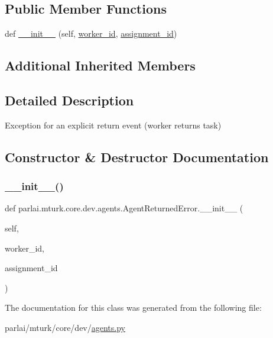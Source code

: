\subsection*{Public Member Functions}
\begin{DoxyCompactItemize}
\item 
def \hyperlink{classparlai_1_1mturk_1_1core_1_1dev_1_1agents_1_1AgentReturnedError_a95885f02dee5d24bdff9b82f90730061}{\+\_\+\+\_\+init\+\_\+\+\_\+} (self, \hyperlink{classparlai_1_1mturk_1_1core_1_1dev_1_1agents_1_1AbsentAgentError_a26db50c87a5d4954907d538de3da875c}{worker\+\_\+id}, \hyperlink{classparlai_1_1mturk_1_1core_1_1dev_1_1agents_1_1AbsentAgentError_ab9cf020196d28024b307c41a3fff6be1}{assignment\+\_\+id})
\end{DoxyCompactItemize}
\subsection*{Additional Inherited Members}


\subsection{Detailed Description}
\begin{DoxyVerb}Exception for an explicit return event (worker returns task)
\end{DoxyVerb}
 

\subsection{Constructor \& Destructor Documentation}
\mbox{\label{classparlai_1_1mturk_1_1core_1_1dev_1_1agents_1_1AgentReturnedError_a95885f02dee5d24bdff9b82f90730061}} 
\subsubsection{\texorpdfstring{\+\_\+\+\_\+init\+\_\+\+\_\+()}{\_\_init\_\_()}}
{\footnotesize\ttfamily def parlai.\+mturk.\+core.\+dev.\+agents.\+Agent\+Returned\+Error.\+\_\+\+\_\+init\+\_\+\+\_\+ (\begin{DoxyParamCaption}\item[{}]{self,  }\item[{}]{worker\+\_\+id,  }\item[{}]{assignment\+\_\+id }\end{DoxyParamCaption})}



The documentation for this class was generated from the following file\+:\begin{DoxyCompactItemize}
\item 
parlai/mturk/core/dev/\hyperlink{parlai_2mturk_2core_2dev_2agents_8py}{agents.\+py}\end{DoxyCompactItemize}
